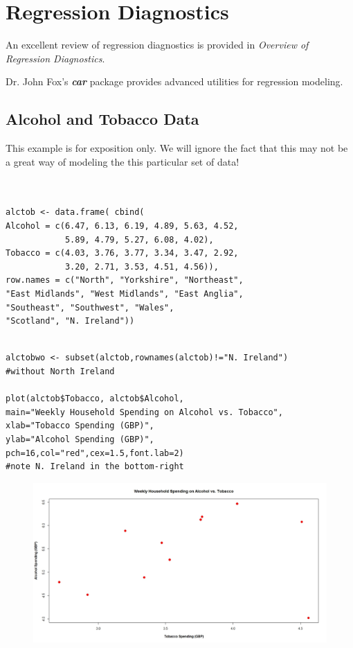 \documentclass[residuals.tex]{subfiles}
\begin{document}
\section*{Regression Diagnostics}

An excellent review of regression diagnostics is provided in  \textit{Overview of Regression Diagnostics}. 

Dr. John Fox's \textbf{\textit{car}} package provides advanced utilities for regression modeling.

\subsection{Alcohol and Tobacco Data}
This example is for exposition only. We will ignore the fact that this may not be a great way of modeling the this particular set of data!


\begin{framed}
\begin{verbatim}


alctob <- data.frame( cbind(
Alcohol = c(6.47, 6.13, 6.19, 4.89, 5.63, 4.52, 
            5.89, 4.79, 5.27, 6.08, 4.02),
Tobacco = c(4.03, 3.76, 3.77, 3.34, 3.47, 2.92, 
            3.20, 2.71, 3.53, 4.51, 4.56)),
row.names = c("North", "Yorkshire", "Northeast", 
"East Midlands", "West Midlands", "East Anglia", 
"Southeast", "Southwest", "Wales", 
"Scotland", "N. Ireland"))


\end{verbatim}
\end{framed}


\begin{framed}
\begin{verbatim}
alctobwo <- subset(alctob,rownames(alctob)!="N. Ireland") 
#without North Ireland

plot(alctob$Tobacco, alctob$Alcohol,
main="Weekly Household Spending on Alcohol vs. Tobacco",
xlab="Tobacco Spending (GBP)",
ylab="Alcohol Spending (GBP)",
pch=16,col="red",cex=1.5,font.lab=2) 
#note N. Ireland in the bottom-right

\end{verbatim}	
\end{framed}
\begin{figure}
\centering
\includegraphics[width=1.3\linewidth]{alcotob}
\caption{}
\label{fig:alcotob}
\end{figure}
\end{document}
